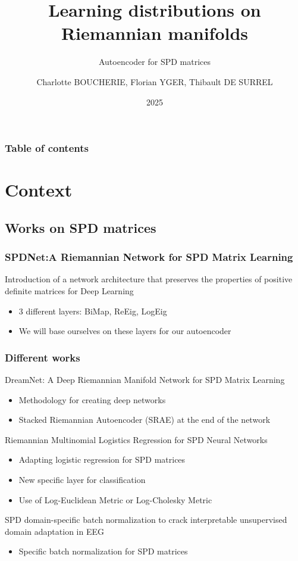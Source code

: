 \documentclass{beamer}
\title[AE SPDnet]
{Learning distributions on Riemannian manifolds}
\subtitle{Autoencoder for SPD matrices}
\author[CB]
{Charlotte BOUCHERIE, Florian YGER, Thibault DE SURREL}
\institute{LITIS}
\date[2025]
{2025}
\begin{document}
\frame{\titlepage}

\begin{frame}
\frametitle{Table of contents}
\tableofcontents
\end{frame}

\section{Context}
\subsection{Works on SPD matrices}
\begin{frame}
\frametitle{SPDNet:A Riemannian Network for SPD Matrix Learning}
Introduction of a network architecture that preserves the properties of positive definite matrices for Deep Learning \cite{DBLP:journals/corr/HuangG16}
\begin{itemize}
    \item 3 different layers: BiMap, ReEig, LogEig
    \item We will base ourselves on these layers for our autoencoder    
\end{itemize}

\end{frame}
\begin{frame}
    \frametitle{Different works}
    DreamNet: A Deep Riemannian Manifold Network for SPD Matrix Learning \cite{wang2022dreamnetdeepriemanniannetwork}
    \begin{itemize}
        \item Methodology for creating deep networks
        \item Stacked Riemannian Autoencoder (SRAE) at the end of the network
    \end{itemize}
    Riemannian Multinomial Logistics Regression for SPD Neural Networks \cite{chen2024riemannianmultinomiallogisticsregression}
    \begin{itemize}
        \item Adapting logistic regression for SPD matrices
        \item New specific layer for classification
        \item Use of Log-Euclidean Metric or Log-Cholesky Metric
    \end{itemize}
    SPD domain-specific batch normalization to crack interpretable unsupervised domain adaptation in EEG \cite{kobler2022spddomainspecificbatchnormalization}
    \begin{itemize}
        \item Specific batch normalization for SPD matrices
    \end{itemize}
\end{frame}
\end{document}
